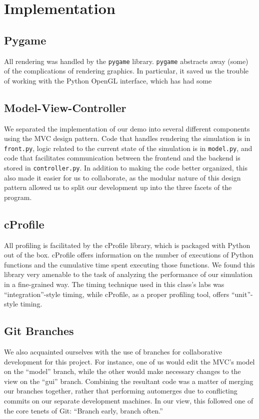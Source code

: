     \section{Implementation}
      \subsection{Pygame}
	All rendering was handled by the \texttt{pygame} library.
	\texttt{pygame} abstracts away (some) of the complications of
	rendering graphics. In particular, it saved us the trouble of
	working with the Python OpenGL interface, which has had some

      \subsection{Model-View-Controller}
	We separated the implementation of our demo into several
	different components using the MVC design pattern. Code that
	handles rendering the simulation is in \texttt{front.py}, logic
	related to the current state of the simulation is in
	\texttt{model.py}, and code that facilitates communication
	between the frontend and the backend is stored in
	\texttt{controller.py}. In addition to making the code better
	organized, this also made it easier for us to collaborate, as
	the modular nature of this design pattern allowed us to split
	our development up into the three facets of the program.

      \subsection{cProfile}
	All profiling is facilitated by the cProfile library, which is
	packaged with Python out of the box. cProfile offers information
	on the number of executions of Python functions and the cumulative
	time spent executing those functions. We found this library very
	amenable to the task of analyzing the performance of our
	simulation in a fine-grained way. The timing technique used in
	this class's labs was ``integration''-style timing, while
	cProfile, as a proper profiling tool, offers ``unit''-style
	timing.

      \subsection{Git Branches}
	We also acquainted ourselves with the use of branches for
	collaborative development for this project. For instance, one of
	us would edit the MVC's model on the ``model'' branch, while the
	other would make necessary changes to the view on the ``gui''
	branch. Combining the resultant code was a matter of merging our
	branches together, rather that performing automerges due to
	conflicting commits on our separate development machines. In our
	view, this followed one of the core tenets of Git: ``Branch
	early, branch often.''

